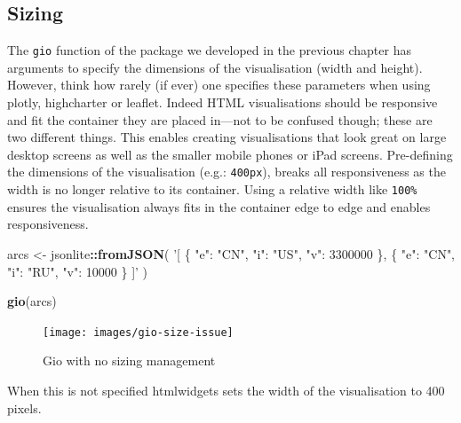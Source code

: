 \documentclass[10pt,]{krantz}
\makeatletter
\newenvironment{Shaded}{\begin{snugshade}}{\end{snugshade}}
\newcommand{\CommentTok}[1]{\textcolor[rgb]{0.37,0.37,0.37}{\textit{#1}}}
\newcommand{\DataTypeTok}[1]{\textcolor[rgb]{0.27,0.27,0.27}{#1}}
\newcommand{\DecValTok}[1]{\textcolor[rgb]{0.06,0.06,0.06}{#1}}
\newcommand{\KeywordTok}[1]{\textcolor[rgb]{0.27,0.27,0.27}{\textbf{#1}}}
\newcommand{\NormalTok}[1]{#1}
\newcommand{\OperatorTok}[1]{\textcolor[rgb]{0.43,0.43,0.43}{\textbf{#1}}}
\newcommand{\StringTok}[1]{\textcolor[rgb]{0.5,0.5,0.5}{#1}}
\newenvironment{kframe}{%
\medskip{}
\setlength{\fboxsep}{.8em}
 \def\at@end@of@kframe{}%
 \ifinner\ifhmode%
  \def\at@end@of@kframe{\end{minipage}}%
  \begin{minipage}{\columnwidth}%
 \fi\fi%
 \def\FrameCommand##1{\hskip\@totalleftmargin \hskip-\fboxsep
 \colorbox{shadecolor}{##1}\hskip-\fboxsep
     \hskip-\linewidth \hskip-\@totalleftmargin \hskip\columnwidth}%
 \MakeFramed {\advance\hsize-\width
   \@totalleftmargin\z@ \linewidth\hsize
   \@setminipage}}%
 {\par\unskip\endMakeFramed%
 \at@end@of@kframe}
\renewenvironment{Shaded}{\begin{kframe}}{\end{kframe}}
\makeatother
\begin{document}
\hypertarget{widgets-adv-sizing}{%
\subsection{Sizing}\label{widgets-adv-sizing}}

The \texttt{gio} function of the package we developed in the previous chapter has arguments to specify the dimensions of the visualisation (width and height). However, think how rarely (if ever) one specifies these parameters when using plotly, highcharter or leaflet. Indeed HTML visualisations should be responsive and fit the container they are placed in---not to be confused though; these are two different things. This enables creating visualisations that look great on large desktop screens as well as the smaller mobile phones or iPad screens. Pre-defining the dimensions of the visualisation (e.g.: \texttt{400px}), breaks all responsiveness as the width is no longer relative to its container. Using a relative width like \texttt{100\%} ensures the visualisation always fits in the container edge to edge and enables responsiveness.

\begin{Shaded}
\begin{Highlighting}[]
\NormalTok{arcs <-}\StringTok{ }\NormalTok{jsonlite}\OperatorTok{::}\KeywordTok{fromJSON}\NormalTok{(}
  \StringTok{'[}
\StringTok{    \{}
\StringTok{      "e": "CN",}
\StringTok{      "i": "US",}
\StringTok{      "v": 3300000}
\StringTok{    \},}
\StringTok{    \{}
\StringTok{      "e": "CN",}
\StringTok{      "i": "RU",}
\StringTok{      "v": 10000}
\StringTok{    \}}
\StringTok{  ]'}
\NormalTok{)}

\KeywordTok{gio}\NormalTok{(arcs)}
\end{Highlighting}
\end{Shaded}

\begin{figure}[H]

{\centering \texttt{[image: images/gio-size-issue]} 

}

\caption{Gio with no sizing management}\label{fig:gio-size-issue}
\end{figure}

When this is not specified htmlwidgets sets the width of the visualisation to 400 pixels.

\begin{Shaded}
\end{Shaded}
\end{document}
